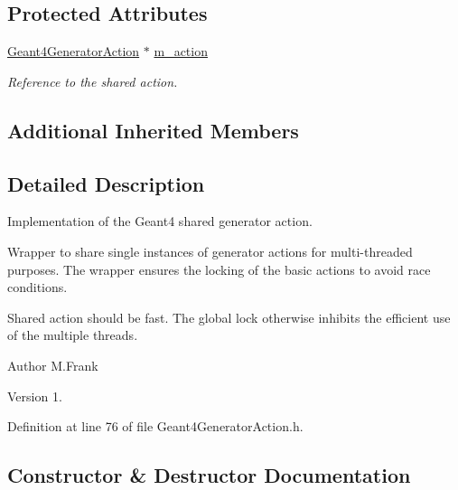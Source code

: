 \subsection*{Protected Attributes}
\begin{DoxyCompactItemize}
\item 
\hyperlink{class_d_d4hep_1_1_simulation_1_1_geant4_generator_action}{Geant4\+Generator\+Action} $\ast$ \hyperlink{class_d_d4hep_1_1_simulation_1_1_geant4_shared_generator_action_ac161fab3e1f99c7dc5a8555bacb904a2}{m\+\_\+action}
\begin{DoxyCompactList}\small\item\em Reference to the shared action. \end{DoxyCompactList}\end{DoxyCompactItemize}
\subsection*{Additional Inherited Members}


\subsection{Detailed Description}
Implementation of the Geant4 shared generator action. 

Wrapper to share single instances of generator actions for multi-\/threaded purposes. The wrapper ensures the locking of the basic actions to avoid race conditions.

Shared action should be \textquotesingle{}fast\textquotesingle{}. The global lock otherwise inhibits the efficient use of the multiple threads.

\begin{DoxyAuthor}{Author}
M.\+Frank 
\end{DoxyAuthor}
\begin{DoxyVersion}{Version}
1. 
\end{DoxyVersion}


Definition at line 76 of file Geant4\+Generator\+Action.\+h.



\subsection{Constructor \& Destructor Documentation}
\hypertarget{class_d_d4hep_1_1_simulation_1_1_geant4_shared_generator_action_af6389a70f8ee9868501378ad4a12b3d4}{}\label{class_d_d4hep_1_1_simulation_1_1_geant4_shared_generator_action_af6389a70f8ee9868501378ad4a12b3d4} 
